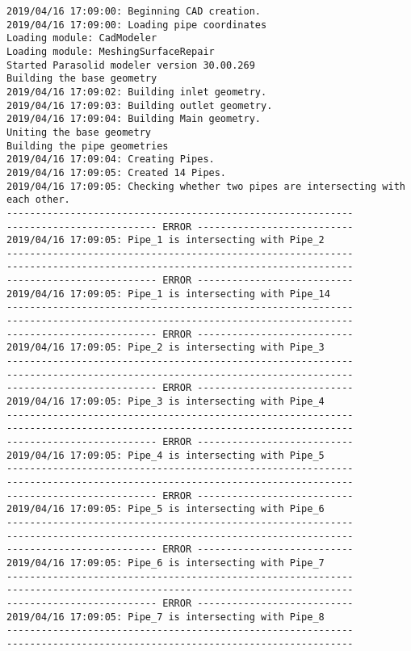 \documentclass{article}
\begin{document}
{\tiny 
\begin{verbatim}
2019/04/16 17:09:00: Beginning CAD creation.
2019/04/16 17:09:00: Loading pipe coordinates
Loading module: CadModeler
Loading module: MeshingSurfaceRepair
Started Parasolid modeler version 30.00.269
Building the base geometry
2019/04/16 17:09:02: Building inlet geometry.
2019/04/16 17:09:03: Building outlet geometry.
2019/04/16 17:09:04: Building Main geometry.
Uniting the base geometry
Building the pipe geometries
2019/04/16 17:09:04: Creating Pipes.
2019/04/16 17:09:05: Created 14 Pipes.
2019/04/16 17:09:05: Checking whether two pipes are intersecting with each other.
------------------------------------------------------------
-------------------------- ERROR ---------------------------
2019/04/16 17:09:05: Pipe_1 is intersecting with Pipe_2
------------------------------------------------------------
------------------------------------------------------------
-------------------------- ERROR ---------------------------
2019/04/16 17:09:05: Pipe_1 is intersecting with Pipe_14
------------------------------------------------------------
------------------------------------------------------------
-------------------------- ERROR ---------------------------
2019/04/16 17:09:05: Pipe_2 is intersecting with Pipe_3
------------------------------------------------------------
------------------------------------------------------------
-------------------------- ERROR ---------------------------
2019/04/16 17:09:05: Pipe_3 is intersecting with Pipe_4
------------------------------------------------------------
------------------------------------------------------------
-------------------------- ERROR ---------------------------
2019/04/16 17:09:05: Pipe_4 is intersecting with Pipe_5
------------------------------------------------------------
------------------------------------------------------------
-------------------------- ERROR ---------------------------
2019/04/16 17:09:05: Pipe_5 is intersecting with Pipe_6
------------------------------------------------------------
------------------------------------------------------------
-------------------------- ERROR ---------------------------
2019/04/16 17:09:05: Pipe_6 is intersecting with Pipe_7
------------------------------------------------------------
------------------------------------------------------------
-------------------------- ERROR ---------------------------
2019/04/16 17:09:05: Pipe_7 is intersecting with Pipe_8
------------------------------------------------------------
------------------------------------------------------------

\end{verbatim}}
\end{document}

